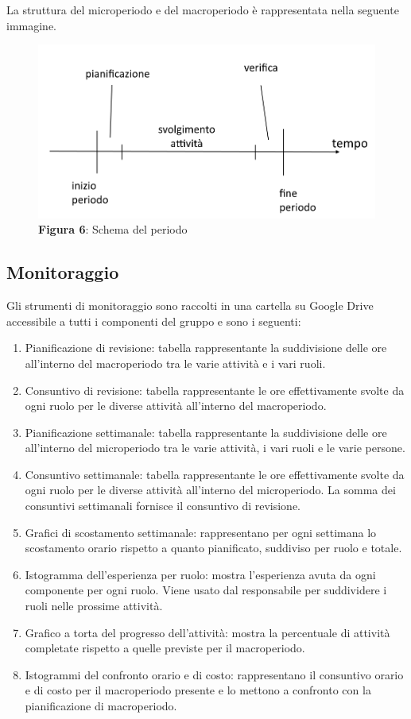 La struttura del microperiodo e del macroperiodo è rappresentata nella seguente immagine.
\begin{figure}[H]
	\centering
	\includegraphics[width=0.7\linewidth]{res/images/schema_periodo.png}
	\caption*{\textbf{Figura 6}: Schema del periodo}
	\label{fig:Figura2}
\end{figure}

\subsection{Monitoraggio}
Gli strumenti di monitoraggio sono raccolti in una cartella su Google Drive accessibile a tutti i componenti del gruppo e sono i seguenti:
\begin{enumerate}
	\item Pianificazione di revisione: tabella rappresentante la suddivisione delle ore all'interno del macroperiodo tra le varie attività e i vari ruoli.
	\item Consuntivo di revisione: tabella rappresentante le ore effettivamente svolte da ogni ruolo per le diverse attività all'interno del macroperiodo.
	\item Pianificazione settimanale: tabella rappresentante la suddivisione delle ore all'interno del microperiodo tra le varie attività, i vari ruoli e le varie persone.
	\item Consuntivo settimanale: tabella rappresentante le ore effettivamente svolte da ogni ruolo per le diverse attività all'interno del microperiodo. La somma dei consuntivi settimanali fornisce il consuntivo di revisione.
	\item Grafici di scostamento settimanale: rappresentano per ogni settimana lo scostamento orario rispetto a quanto pianificato, suddiviso per ruolo e totale.
	\item Istogramma dell'esperienza per ruolo: mostra l'esperienza avuta da ogni componente per ogni ruolo. Viene usato dal responsabile per suddividere i ruoli nelle prossime attività.
	\item Grafico a torta del progresso dell'attività: mostra la percentuale di attività completate rispetto a quelle previste per il macroperiodo.
	\item Istogrammi del confronto orario e di costo: rappresentano il consuntivo orario e di costo per il macroperiodo presente e lo mettono a confronto con la pianificazione di macroperiodo.
\end{enumerate}

